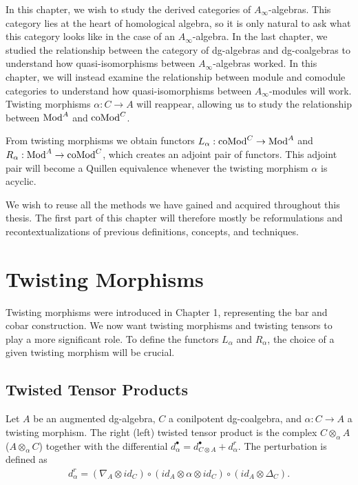 \documentclass[../thesis.tex]{subfiles}
\begin{document}
    In this chapter, we wish to study the derived categories of $A_\infty$-algebras. This category lies at the heart of homological algebra, so it is only natural to ask what this category looks like in the case of an $A_\infty$-algebra. In the last chapter, we studied the relationship between the category of dg-algebras and dg-coalgebras to understand how quasi-isomorphisms between $A_\infty$-algebras worked. In this chapter, we will instead examine the relationship between module and comodule categories to understand how quasi-isomorphisms between $A_\infty$-modules will work. Twisting morphisms $\alpha: C \rightarrow A$ will reappear, allowing us to study the relationship between $\tt{Mod}^A$ and $\tt{coMod}^C$.

    From twisting morphisms we obtain functors $L_\alpha : \tt{coMod}^C \rightarrow \tt{Mod}^A$ and $R_\alpha : \tt{Mod}^A \rightarrow \tt{coMod}^C$, which creates an adjoint pair of functors. This adjoint pair will become a Quillen equivalence whenever the twisting morphism $\alpha$ is acyclic.

    We wish to reuse all the methods we have gained and acquired throughout this thesis. The first part of this chapter will therefore mostly be reformulations and recontextualizations of previous definitions, concepts, and techniques. 

    \section{Twisting Morphisms}

        Twisting morphisms were introduced in Chapter 1, representing the bar and cobar construction. We now want twisting morphisms and twisting tensors to play a more significant role. To define the functors $L_\alpha$ and $R_\alpha$, the choice of a given twisting morphism will be crucial.  

        \subsection{Twisted Tensor Products}

            Let $A$ be an augmented dg-algebra, $C$ a conilpotent dg-coalgebra, and $\alpha: C \rightarrow A$ a twisting morphism. The right (left) twisted tensor product is the complex $C \otimes_\alpha A$ ($A\otimes_\alpha C$) together with the differential $d_\alpha^\bullet = d_{C\otimes A}^\bullet + d_\alpha^r$. The perturbation is defined as
            \begin{align*}
                d_\alpha^r = (\nabla_A\otimes id_C) \circ (id_A \otimes \alpha \otimes id_C) \circ (id_A \otimes \Delta_C).
            \end{align*}
\end{document}
